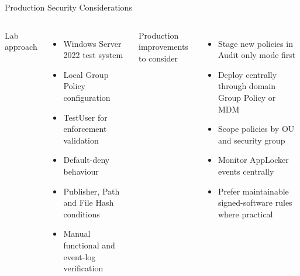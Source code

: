 \documentclass[aspectratio=169,10pt]{beamer}
\newcommand{\sectionlabel}[1]{%
	{\color{PortfolioTeal}\large #1}
}
\newcommand{\bluelabel}[1]{%
	{\color{PortfolioBlue}\large #1}
}
\begin{document}
	\begin{frame}{Production Security Considerations}
		
		\begin{columns}[T,onlytextwidth]
			
			
			\sectionlabel{Lab approach}
			
			\begin{itemize}
				\small
				\setlength\itemsep{0.07cm}
				
				\item Windows Server 2022 test system
				
				\item Local Group Policy configuration
				
				\item TestUser for enforcement validation
				
				\item Default-deny behaviour
				
				\item Publisher, Path and File Hash conditions
				
				\item Manual functional and event-log verification
				
			\end{itemize}
			
			
			\bluelabel{Production improvements to consider}
			
			\begin{itemize}
				\small
				\setlength\itemsep{0.07cm}
				
				\item Stage new policies in Audit only mode first
				
				\item Deploy centrally through domain Group Policy or MDM
				
				\item Scope policies by OU and security group
				
				\item Monitor AppLocker events centrally
				
				\item Prefer maintainable signed-software rules
				where practical
				

\end{itemize}
\end{columns}
\end{frame}
\end{document}
